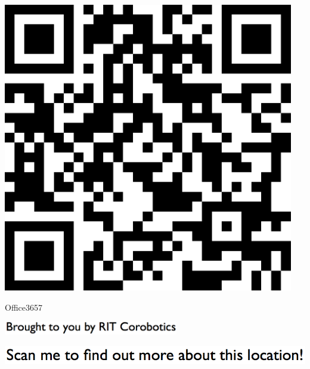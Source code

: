 \documentclass[letterpaper]{article}
\begin{document}
 \begingroup 
 \centerline{\includegraphics[scale=1,width=5in,height=5in]{Office3657.png}} 
 \endgroup 
 \vspace*{\fill} 

 \hfill{\small Office3657} 

  \vspace{0.7in} 
 
 \centerline{\includegraphics[scale=1,width=3in]{text-bottom.png}} 
 
 \pagebreak 
{} 
 \vspace*{\fill} 
 
  \centerline{\includegraphics[scale=1,width=6in]{text-top.png}} 
 
 \vspace{0.5in} 
 
\end{document}
